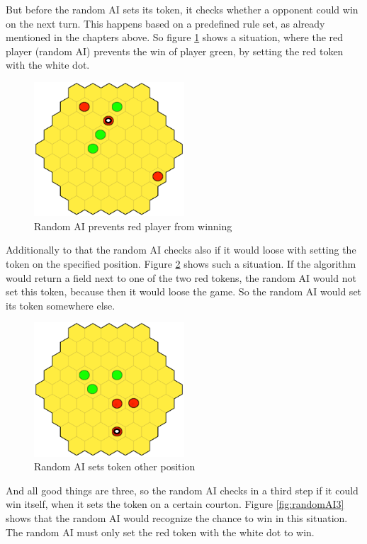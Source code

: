 \documentclass[english]{report}
\begin{document}
But before the random AI 
sets its token, it checks whether a opponent could win on the next turn. This happens based on a predefined rule set, as already mentioned in the chapters above. So figure \ref{fig:randomAI1} shows a situation, where the red player (random AI) prevents the win of player green, by setting the red token with the white dot.
\begin{figure}[ht]
\centering
\includegraphics[width=0.5\textwidth]{Abbildungen/randomAI1.png}
\caption{Random AI prevents red player from winning }
\label{fig:randomAI1}
\end{figure}
Additionally to that the random AI checks also if it would loose with setting the token on the specified position. Figure \ref{fig:randomAI2} shows such a situation. If the algorithm would return a field next to one of the two red tokens, the random AI would not set this token, because then it would loose the game. So the random AI would set its token somewhere else.
\begin{figure}[ht]
\centering
\includegraphics[width=0.5\textwidth]{Abbildungen/randomAI2.png}
\caption{Random AI sets token other position}
\label{fig:randomAI2}
\end{figure}
And all good things are three, so the random AI checks in a third 
step if it could win itself, when it sets the token on a certain courton. Figure \ref{fig:randomAI3} shows that the random AI would recognize the chance to win in this situation. The random AI must only set the red token with the white dot to win.
\end{document}
